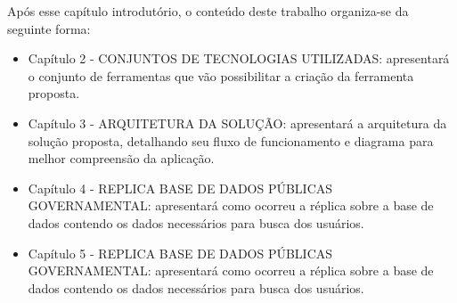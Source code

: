 Após esse capítulo introdutório, o conteúdo deste trabalho organiza-se da seguinte forma:
	\begin{itemize}
		\item{Capítulo 2 - \uppercase{Conjuntos de tecnologias utilizadas}: apresentará o conjunto de ferramentas que vão possibilitar a criação da ferramenta proposta.}
		\item{Capítulo 3 - \uppercase{Arquitetura da solução}: apresentará a arquitetura da solução proposta, detalhando seu fluxo de funcionamento e diagrama para melhor compreensão da aplicação.}
		\item{Capítulo 4 - \uppercase{Replica base de dados públicas governamental}: apresentará como ocorreu a réplica sobre a base de dados contendo os dados necessários para busca dos usuários.}
		\item{Capítulo 5 - \uppercase{Replica base de dados públicas governamental}: apresentará como ocorreu a réplica sobre a base de dados contendo os dados necessários para busca dos usuários.}
	\end{itemize}
